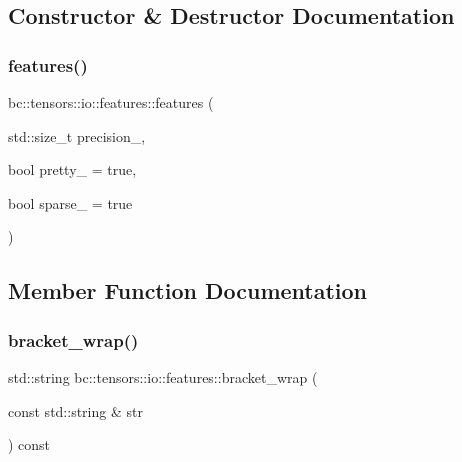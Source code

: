 \subsection{Constructor \& Destructor Documentation}
\mbox{\label{structbc_1_1tensors_1_1io_1_1features_ad5adb7defbf361fc9f2270469f119c88}} 
\subsubsection{\texorpdfstring{features()}{features()}}
{\footnotesize\ttfamily bc\+::tensors\+::io\+::features\+::features (\begin{DoxyParamCaption}\item[{std\+::size\+\_\+t}]{precision\+\_\+,  }\item[{bool}]{pretty\+\_\+ = {\ttfamily true},  }\item[{bool}]{sparse\+\_\+ = {\ttfamily true} }\end{DoxyParamCaption})\hspace{0.3cm}{\ttfamily [inline]}}



\subsection{Member Function Documentation}
\mbox{\label{structbc_1_1tensors_1_1io_1_1features_a95d5d59f0e760068f8bb0845677659f8}} 
\subsubsection{\texorpdfstring{bracket\+\_\+wrap()}{bracket\_wrap()}}
{\footnotesize\ttfamily std\+::string bc\+::tensors\+::io\+::features\+::bracket\+\_\+wrap (\begin{DoxyParamCaption}\item[{const std\+::string \&}]{str }\end{DoxyParamCaption}) const\hspace{0.3cm}{\ttfamily [inline]}}


